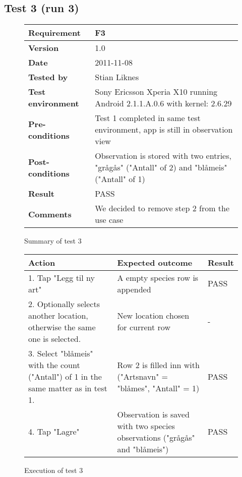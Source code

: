 \newpage
\subsection{Test 3 (run 3)}

	\begin{figure}[htb]
		\centering
		\begin{tabular}{|p{3.5cm}|p{7.0cm}|} \hline
			\textbf{Requirement} & F3 \\ \hline
			\textbf{Version} & 1.0 \\ \hline
			\textbf{Date} & 2011-11-08 \\ \hline
			\textbf{Tested by} & Stian Liknes \\ \hline
			\textbf{Test environment} & Sony Ericsson Xperia X10 running Android 2.1.1.A.0.6 with kernel: 2.6.29 \\ \hline
			\textbf{Pre-conditions} & Test 1 completed in same test environment, app is still in observation view \\ \hline
			\textbf{Post-conditions} & Observation is stored with two entries, "grågås" ("Antall" of 2) and "blåmeis" ("Antall" of 1) \\ \hline
			\textbf{Result} & PASS \\ \hline
			\textbf{Comments} & We decided to remove step 2 from the use case \\ \hline
		\end{tabular}
		\caption{Summary of test 3}
	\end{figure}

	\begin{figure}[htb]
		\centering
		\begin{tabular}{|p{5.0cm}|p{5.0cm}|p{1cm}|}
			\hline \textbf{Action} & \textbf{Expected outcome} & \textbf{Result} \\ \hline

			1. Tap "Legg til ny art" &
			A empty species row is appended &
			PASS \\ \hline
			
			2. Optionally selects another location, otherwise the same one is
			selected. & 
			New location chosen for current row &
			- \\ \hline

			3. Select "blåmeis" with the count ("Antall") of 1 in the same matter 
			as in test 1. &
			Row 2 is filled inn with ("Artsnavn" = "blåmes", "Antall" = 1) &
			PASS \\ \hline

			4. Tap "Lagre" &
			Observation is saved with two species observations ("grågås" and "blåmeis") &
			PASS \\ \hline
		\end{tabular}
		\caption{Execution of test 3}
	\end{figure}

